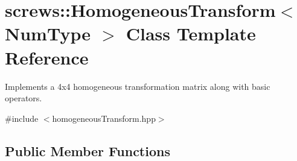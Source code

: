 \hypertarget{classscrews_1_1_homogeneous_transform}{\section{screws\+:\+:Homogeneous\+Transform$<$ Num\+Type $>$ Class Template Reference}
\label{classscrews_1_1_homogeneous_transform}
}


Implements a 4x4 homogeneous transformation matrix along with basic operators.  




{\ttfamily \#include $<$homogeneous\+Transform.\+hpp$>$}

\subsection*{Public Member Functions}
